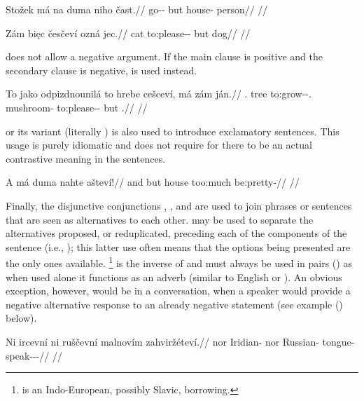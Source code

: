 \pex
\begingl
\gla Stožek má na duma niho čast.//
\glb go-\Av{}-\Pf{} but \Loc{} house-\Pat{}  person//
\glft {}//
\endgl
\xe


\pex[tag=ozna]
\begingl
\gla Zám bi\k{e}c česčeví ozná jec.//
\glb \Neg{} cat to:please-\Av{}-\Cont{} but dog//
\glft {}//
\endgl
\xe

 does not allow a negative argument. If the main clause is positive and the secondary clause is negative,  is used instead.

\pex
\begingl
\gla To jako odpizdnounil\'a to hrebe ce\v{s}cev\'i, m\'a z\'am j\'an.//
\glb \Dem{}.\Prox{} tree to:grow-\Loc{}-\Subj{}.\Ipf{} \Rz{} mushroom-\Pat{} to:please-\Av{}-\Cont{} but \Neg{} \Dem{}.\Med{}//
\glft {}//
\endgl
\xe

 or its variant  (literally ) is also used to introduce exclamatory sentences. This usage is purely idiomatic and does not require for there to be an actual contrastive meaning in the sentences.

\pex
\begingl
\gla A m\'a duma nahte a\v{s}tev\'i!//
\glb and but house too:much be:pretty-\Cont{}//
\glft {}//
\endgl
\xe

Finally, the disjunctive conjunctions , , and  are used to join phrases or sentences that are seen as alternatives to each other.  may be used to separate the alternatives proposed, or reduplicated, preceding each of the components of the sentence (i.e., ); this latter use often means that the options being presented are the only ones available. \footnote{ is an Indo-European, possibly Slavic, borrowing.} is the inverse of  and must always be used in pairs () as when used alone it functions as an adverb (similar to English  or ). An obvious exception, however, would be in a conversation, when a speaker would provide a negative alternative response to an already negative statement (see example () below).

\pex
\begingl
\gla Ni ircevn\'i ni ru\v{s}\v{c}evn\'i malnov\'im zahviržétev\'i.//
\glb nor Iridian-\Att{} nor Russian-\Att{} tongue-\Ins{} speak-\Av{}-\Pot{}-\Cont{}//
\glft {}//
\endgl
\xe

